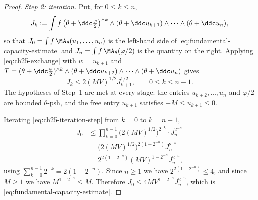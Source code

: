\begin{proof}
\emph{Step 2: iteration.}  Put, for $0\leq k\leq n$,
\[
 J_k:=\int f\,
  \bigl(\theta+\ddc\tfrac\varphi2\bigr)^{\wedge k}
  \wedge(\theta+\ddc u_{k+1})\wedge\cdots\wedge(\theta+\ddc u_n),
\]
so that $J_0=\int f\,\MA_\theta(u_1,\ldots,u_n)$ is the left-hand side of
\eqref{eq:fundamental-capacity-estimate} and
$J_n=\int f\,\MA_\theta(\varphi/2)$ is the quantity on the right.  Applying
\eqref{eq:ch25-exchange} with $w=u_{k+1}$ and
$T=(\theta+\ddc\frac\varphi2)^{\wedge k}\wedge(\theta+\ddc u_{k+2})
\wedge\cdots\wedge(\theta+\ddc u_n)$ gives
\begin{equation}
\label{eq:ch25-iteration-step}
 J_k\leq2(MV)^{1/2}J_{k+1}^{1/2},\qquad 0\leq k\leq n-1 .
\end{equation}
The hypotheses of Step~1 are met at every stage: the entries
$u_{k+2},\ldots,u_n$ and $\varphi/2$ are bounded $\theta$-psh, and the
free entry $u_{k+1}$ satisfies $-M\leq u_{k+1}\leq0$.

Iterating \eqref{eq:ch25-iteration-step} from $k=0$ to $k=n-1$,
\[
 \begin{aligned}
 J_0&\leq\prod_{k=0}^{n-1}\bigl(2(MV)^{1/2}\bigr)^{2^{-k}}\cdot
 J_n^{2^{-n}}\\
 &=\bigl(2(MV)^{1/2}\bigr)^{2(1-2^{-n})}J_n^{2^{-n}}\\
 &=2^{2(1-2^{-n})}(MV)^{1-2^{-n}}J_n^{2^{-n}},
 \end{aligned}
\]
using $\sum_{k=0}^{n-1}2^{-k}=2(1-2^{-n})$.  Since $n\geq1$ we have
$2^{2(1-2^{-n})}\leq4$, and since $M\geq1$ we have
$M^{1-2^{-n}}\leq M$.  Therefore
$J_0\leq4MV^{1-2^{-n}}J_n^{2^{-n}}$, which is
\eqref{eq:fundamental-capacity-estimate}.
\end{proof}


